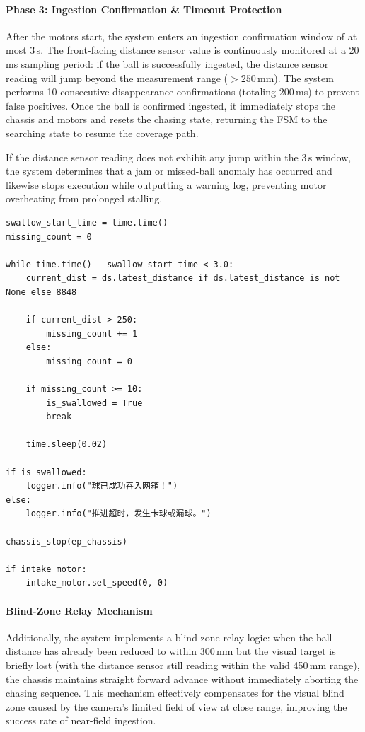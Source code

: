 \paragraph{Phase 3: Ingestion Confirmation \& Timeout Protection}

After the motors start, the system enters an ingestion confirmation window of at most 3\,s. The front-facing distance sensor value is continuously monitored at a 20\,ms sampling period: if the ball is successfully ingested, the distance sensor reading will jump beyond the measurement range ($>250\,$mm). The system performs 10 consecutive disappearance confirmations (totaling 200\,ms) to prevent false positives. Once the ball is confirmed ingested, it immediately stops the chassis and motors and resets the chasing state, returning the FSM to the searching state to resume the coverage path.

If the distance sensor reading does not exhibit any jump within the 3\,s window, the system determines that a jam or missed-ball anomaly has occurred and likewise stops execution while outputting a warning log, preventing motor overheating from prolonged stalling.

\begin{verbatim}
swallow_start_time = time.time()
missing_count = 0

while time.time() - swallow_start_time < 3.0:
    current_dist = ds.latest_distance if ds.latest_distance is not None else 8848

    if current_dist > 250:
        missing_count += 1
    else:
        missing_count = 0

    if missing_count >= 10:
        is_swallowed = True
        break

    time.sleep(0.02)

if is_swallowed:
    logger.info("球已成功吞入网箱！")
else:
    logger.info("推进超时，发生卡球或漏球。")

chassis_stop(ep_chassis)

if intake_motor:
    intake_motor.set_speed(0, 0)
\end{verbatim}

\paragraph{Blind-Zone Relay Mechanism}

Additionally, the system implements a blind-zone relay logic: when the ball distance has already been reduced to within 300\,mm but the visual target is briefly lost (with the distance sensor still reading within the valid 450\,mm range), the chassis maintains straight forward advance without immediately aborting the chasing sequence. This mechanism effectively compensates for the visual blind zone caused by the camera's limited field of view at close range, improving the success rate of near-field ingestion.



